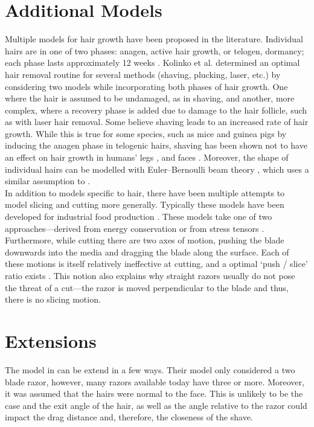 \documentclass[11pt,a4paper]{article}
\begin{document}
\section{Additional Models}
Multiple models for hair growth have been proposed in the literature. Individual hairs are in one of two phases: anagen, active hair growth, or telogen, dormancy; each phase lasts approximately 12 weeks \cite{kolinko}. Kolinko et al. \cite{kolinko} determined an optimal hair removal routine for several methods (shaving, plucking, laser, etc.) by considering two models while incorporating both phases of hair growth. One where the hair is assumed to be undamaged, as in shaving, and another, more complex, where a recovery phase is added due to damage to the hair follicle, such as with laser hair removal. Some believe shaving leads to an increased rate of hair growth. While this is true for some species, such as mice and guinea pigs \cite{lynfield} by inducing the anagen phase in telogenic hairs, shaving has been shown not to have an effect on hair growth in humans' legs \cite{lynfield}, and faces \cite{trotter}. Moreover, the shape of individual hairs can be modelled with Euler--Bernoulli beam theory \cite{howison}, which uses a similar assumption to \cite{fitt}. \\

In addition to models specific to hair, there have been multiple attempts to model slicing and cutting more generally. Typically these models have been developed for industrial food production \cite{atkins2004, atkins2005, gubenia, zhou}. These models take one of two approaches---derived from energy conservation \cite{gubenia, zhou} or from stress tensors \cite{zhou}. Furthermore, while cutting there are two axes of motion, pushing the blade downwards into the media and dragging the blade along the surface. Each of these motions is itself relatively ineffective at cutting, and a optimal `push / slice' ratio exists \cite{atkins2004, atkins2005}. This notion also explains why straight razors usually do not pose the threat of a cut---the razor is moved perpendicular to the blade and thus, there is no slicing motion.

\section{Extensions}
The model in \cite{fitt} can be extend in a few ways. Their model only considered a two blade razor, however, many razors available today have three or more. Moreover, it was assumed that the hairs were normal to the face. This is unlikely to be the case and the exit angle of the hair, as well as the angle relative to the razor could impact the drag distance and, therefore, the closeness of the shave.


\end{document}
